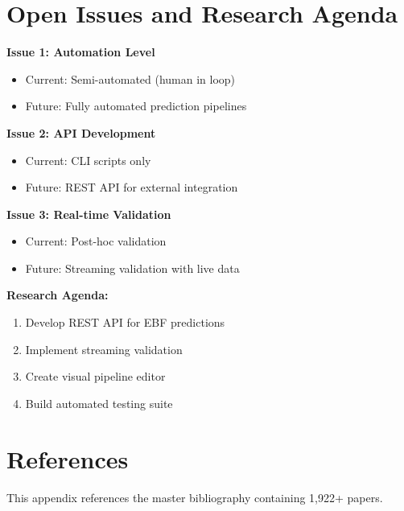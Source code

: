 \section{Open Issues and Research Agenda}
\label{sec:dp-open-issues}

\begin{tcolorbox}[colback=red!5!white, colframe=red!75!black,
    title=\textbf{Open Issues}]

\textbf{Issue 1: Automation Level}
\begin{itemize}[nosep]
    \item Current: Semi-automated (human in loop)
    \item Future: Fully automated prediction pipelines
\end{itemize}

\textbf{Issue 2: API Development}
\begin{itemize}[nosep]
    \item Current: CLI scripts only
    \item Future: REST API for external integration
\end{itemize}

\textbf{Issue 3: Real-time Validation}
\begin{itemize}[nosep]
    \item Current: Post-hoc validation
    \item Future: Streaming validation with live data
\end{itemize}

\end{tcolorbox}

\textbf{Research Agenda:}
\begin{enumerate}[nosep]
    \item Develop REST API for EBF predictions
    \item Implement streaming validation
    \item Create visual pipeline editor
    \item Build automated testing suite
\end{enumerate}

\section{References}
\label{sec:dp-references}

This appendix references the master bibliography containing 1,922+ papers.

